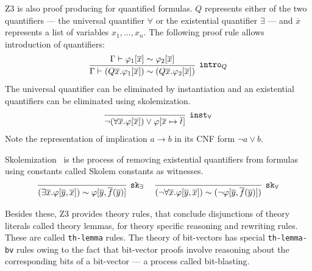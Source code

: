 \documentclass{article}
\begin{document}
		Z3 is also proof producing for quantified formulas.
		$Q$ represents either of the two quantifiers --- 
		the universal quantifier $\forall$ or the 
		existential quantifier $\exists$ --- and 
		$\overline{x}$ represents a list of variables 
		$x_1,...,x_n$. The following 
		proof rule allows introduction of quantifiers:
		\begin{equation*}
			\infer[\texttt{intro$_Q$}]
			{\Gamma \vdash (Q \overline{x}.\varphi_1 [ \overline{x}]) \sim (Q \overline{x}.\varphi_2 [ \overline{x}])}
			{\Gamma \vdash \varphi_1 [\overline{x}] \sim \varphi_2 [\overline{x}]}
		\end{equation*}
		The universal quantifier can be eliminated by 
		instantiation and an existential quantifiers 
		can be eliminated using skolemization.
		\begin{equation*}
		\infer[\texttt{inst$_\forall$}]
			{\neg(\forall\overline{x}.\varphi[\overline{x}])
			\lor \varphi[\overline{x} \mapsto \overline{t}]}
			{}
		\end{equation*}
		Note the representation of implication $a \to b$ in 
		its CNF form $\neg a \lor b$.
		
		Skolemization~\cite{NONNENGART2001335} is the process 
		of removing existential quantifiers from formulas using 
		constants called Skolem constants as witnesses.
		\begin{equation*}
		\infer[\texttt{sk$_\exists$}]
			{(\exists\overline{x}.\varphi[\overline{y},\overline{x}]) 
			\sim \varphi[\overline{y},\overline{f}(\overline{y})]}
			{}\ \ \ \ 
		\infer[\texttt{sk$_\forall$}]
		{(\neg\forall\overline{x}.\varphi[\overline{y},\overline{x}]) 
			\sim (\neg \varphi[\overline{y},\overline{f}(\overline{y})])}
		{}	
		\end{equation*}
		
		Besides these, Z3 provides theory rules, 
		that conclude disjunctions of theory literals 
		called theory lemmas, for theory specific reasoning
		and rewriting rules. These are called 
		\texttt{th-lemma} rules. The theory of bit-vectors
		has special \texttt{th-lemma-bv} rules owing to 
		the fact that bit-vector proofs involve reasoning 
		about the corresponding bits of a bit-vector --- 
		a process called bit-blasting. 
		
\end{document}
